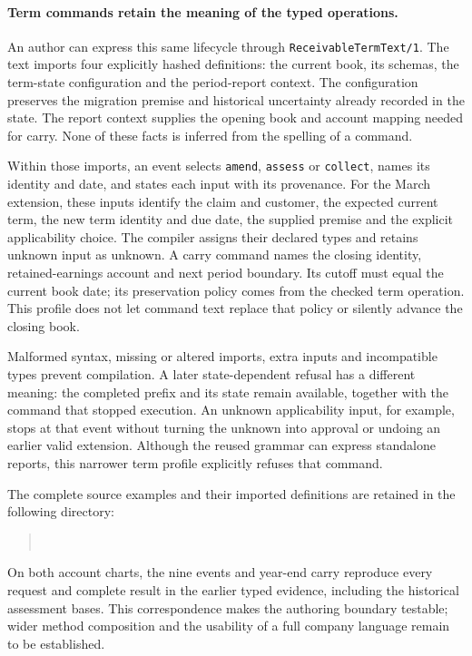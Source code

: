 \paragraph{Term commands retain the meaning of the typed operations.}
An author can express this same lifecycle through
\texttt{ReceivableTermText/1}. The text imports four explicitly hashed
definitions: the current book, its schemas, the term-state configuration and
the period-report context. The configuration preserves the migration premise
and historical uncertainty already recorded in the state. The report context
supplies the opening book and account mapping needed for carry. None of these
facts is inferred from the spelling of a command.

Within those imports, an event selects \texttt{amend}, \texttt{assess} or
\texttt{collect}, names its identity and date, and states each input with its
provenance. For the March extension, these inputs identify the claim and
customer, the expected current term, the new term identity and due date,
the supplied premise and the explicit applicability choice. The compiler
assigns their declared types and retains unknown input as unknown. A carry
command names the closing identity, retained-earnings account and next period
boundary. Its cutoff must equal the current book date; its preservation policy
comes from the checked term operation. This profile does not let command text
replace that policy or silently advance the closing book.

Malformed syntax, missing or altered imports, extra inputs and incompatible
types prevent compilation. A later state-dependent refusal has a different
meaning: the completed prefix and its state remain available, together with
the command that stopped execution. An unknown applicability input, for
example, stops at that event without turning the unknown into approval or
undoing an earlier valid extension. Although the reused grammar can express
standalone reports, this narrower term profile explicitly refuses that command.

The complete source examples and their imported definitions are retained in
the following directory:
\begin{quote}
\small{}\\
\end{quote}
On both account charts, the nine events and year-end carry reproduce every
request and complete result in the earlier typed evidence, including the
historical assessment bases. This correspondence makes the authoring boundary
testable; wider method composition and the usability of a full company language
remain to be established.



